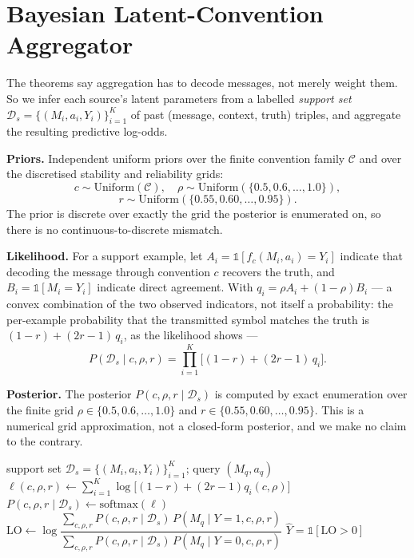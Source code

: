 \section{Bayesian Latent-Convention Aggregator}
\label{sec:method}

The theorems say aggregation has to decode messages, not merely weight
them. So we infer each source's latent parameters from a labelled
\emph{support set} $\mathcal{D}_s = \{(M_i, a_i, Y_i)\}_{i=1}^K$ of past
(message, context, truth) triples, and aggregate the resulting predictive
log-odds.

\textbf{Priors.} Independent uniform priors over the finite convention
family $\mathcal{C}$ and over the discretised stability and reliability
grids:
\[
c \sim \mathrm{Uniform}(\mathcal{C}), \quad
\rho \sim \mathrm{Uniform}(\{0.5, 0.6, \ldots, 1.0\}),
\]
\[
r \sim \mathrm{Uniform}(\{0.55, 0.60, \ldots, 0.95\}).
\]
The prior is discrete over exactly the grid the posterior is enumerated
on, so there is no continuous-to-discrete mismatch.

\textbf{Likelihood.} For a support example, let
$A_i = \mathbb{1}[f_c(M_i, a_i) = Y_i]$ indicate that decoding the message
through convention $c$ recovers the truth, and
$B_i = \mathbb{1}[M_i = Y_i]$ indicate direct agreement. With
$q_i = \rho A_i + (1-\rho) B_i$ --- a convex combination of the two
observed indicators, not itself a probability: the per-example
probability that the transmitted symbol matches the truth is
$(1-r) + (2r-1)\,q_i$, as the likelihood shows ---
\begin{equation}
P(\mathcal{D}_s \mid c, \rho, r)
= \prod_{i=1}^K \big[(1-r) + (2r-1)\, q_i\big].
\end{equation}

\textbf{Posterior.} The posterior $P(c,\rho,r \mid \mathcal{D}_s)$ is
computed by exact enumeration over the finite grid
$\rho \in \{0.5, 0.6, \ldots, 1.0\}$ and
$r \in \{0.55, 0.60, \ldots, 0.95\}$. This is a numerical grid
approximation, not a closed-form posterior, and we make no claim to the
contrary.

\begin{algorithm}[t]
\caption{Grid-posterior aggregation for one source}
\label{alg:grid}
\begin{algorithmic}[1]
\Require support set $\mathcal{D}_s = \{(M_i,a_i,Y_i)\}_{i=1}^K$; query $(M_q, a_q)$
  \State $\ell(c,\rho,r) \gets \sum_{i=1}^K \log\big[(1-r) + (2r-1)q_i(c,\rho)\big]$
\EndFor
\State $P(c,\rho,r \mid \mathcal{D}_s) \gets \mathrm{softmax}(\ell)$ 
\State $\mathrm{LO} \gets \log \dfrac{\sum_{c,\rho,r} P(c,\rho,r \mid \mathcal{D}_s)\, P(M_q \mid Y{=}1, c,\rho,r)}{\sum_{c,\rho,r} P(c,\rho,r \mid \mathcal{D}_s)\, P(M_q \mid Y{=}0, c,\rho,r)}$
\State \Return $\hat{Y} = \mathbb{1}[\mathrm{LO} > 0]$ 
\end{algorithmic}
\end{algorithm}

